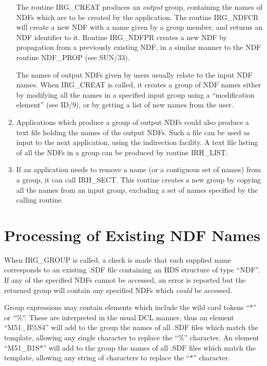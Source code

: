 \begin{enumerate}
The routine IRG\_CREAT produces an {\em output} group, containing the names of 
NDFs which are to be created by the application. The routine IRG\_NDFCR will 
create a new NDF with a name given by a group member, and returns an NDF 
identifier to it. Routine IRG\_NDFPR creates a new NDF by propagation from a 
previously existing NDF, in a similar manner to the NDF routine NDF\_PROP (see 
SUN/33).

The names of output NDFs given by users usually relate to the input NDF names.
When IRG\_CREAT is called, it creates a group of NDF names either by modifying
all the names in a specified input group using a ``modification element'' (see
ID/9), or by getting a list of new names from the user. 

\item Applications which produce a group of output NDFs could also produce a
text file holding the names of the output NDFs. Such a file can be used as input
to the next application, using the indirection facility. A text file listing of
all the NDFs in a group can be produced by routine IRH\_LIST. 

\item If an application needs to remove a name (or a contiguous set of names) 
from a group, it can call IRH\_SECT. This routine creates a new group by copying
all the names from an input group, excluding a set of names specified by the 
calling routine.

\end{enumerate}

\section {Processing of Existing NDF Names}
When IRG\_GROUP is called, a check is made that each supplied name corresponds
to an existing .SDF file containing an HDS structure of type ``NDF''. If any of
the specified NDFs cannot be accessed, an error is reported but the returned
group will contain any specified NDFs which {\em could} be accessed. 

Group expressions may contain elements which include the wild card tokens
``$*$'' or ``\%''. These are interpreted in the usual DCL manner, thus an
element ``M51\_B\%S4'' will add to the group the names of all .SDF files which
match the template, allowing any single character to replace the ``\%''
character. An element ``M51\_B1S$*$'' will add to the group the names of all
.SDF files which match the template, allowing any string of characters to
replace the ``$*$'' character. 

